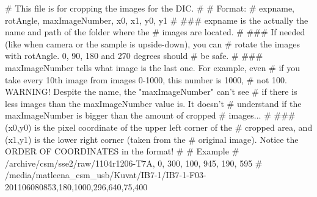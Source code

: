 # This file is for cropping the images for the DIC.
#
# Format:
# expname, rotAngle, maxImageNumber, x0, x1, y0, y1
#
### expname is the actually the name and path of the folder where the
# images are located.
#
### If needed (like when camera or the sample is upside-down), you can
# rotate the images with rotAngle. 0, 90, 180 and 270 degrees should
# be safe.
#
### maxImageNumber tells what image is the last one. For example, even
# if you take every 10th image from images 0-1000, this number is 1000,
# not 100. WARNING! Despite the name, the "maxImageNumber" can't see
# if there is less images than the maxImageNumber value is. It doesn't
# understand  if the maxImageNumber is bigger than the amount of cropped
# images...
#
### (x0,y0) is the pixel coordinate of the upper left corner of the
# cropped area, and (x1,y1) is the lower right corner (taken from the
# original image). Notice the ORDER OF COORDINATES in the format!
#
# Example
# /archive/csm/sse2/raw/1104r1206-T7A, 0, 300, 100, 945, 190, 595
#
/media/matleena_csm_usb/Kuvat/IB7-1/IB7-1-F03-201106080853,180,1000,296,640,75,400
